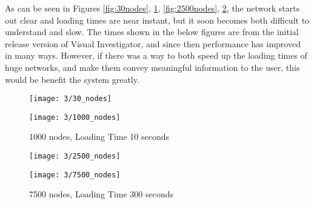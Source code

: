 \documentclass[../dissertation.tex]{subfiles}
\begin{document}
As can be seen in Figures \ref{fig:30nodes}, \ref{fig:1000nodes}, \ref{fig:2500nodes}, \ref{fig:7500nodes}, the network starts out clear and loading times are near instant, but it soon becomes both difficult to understand and slow. The times shown in the below figures are from the initial release version of Visual Investigator, and since then performance has improved in many ways. However, if there was a way to both speed up the loading times of huge networks, and make them convey meaningful information to the user, this would be benefit the system greatly.

\begin{figure}
\centering
\begin{minipage}{.5\textwidth}
    \texttt{[image: 3/30\_nodes]}
    \caption{30 nodes, Loading Time less than 1 second}
    \label{fig:30nodes}
\end{minipage}%
\begin{minipage}{.5\textwidth}
    \texttt{[image: 3/1000\_nodes]}
    \caption{1000 nodes, Loading Time 10 seconds}
    \label{fig:1000nodes}
\end{minipage}
\end{figure}

\begin{figure}
\centering
\begin{minipage}{.5\textwidth}
    \texttt{[image: 3/2500\_nodes]}
    \vspace*{3.5mm}
    \caption{2500 nodes, Loading Time 30 seconds}
    \label{fig:2500nodes}
\end{minipage}%
\begin{minipage}{.5\textwidth}
    \texttt{[image: 3/7500\_nodes]}
    \caption{7500 nodes, Loading Time 300 seconds}
    \label{fig:7500nodes}
\end{minipage}
\end{figure}
\end{document}
